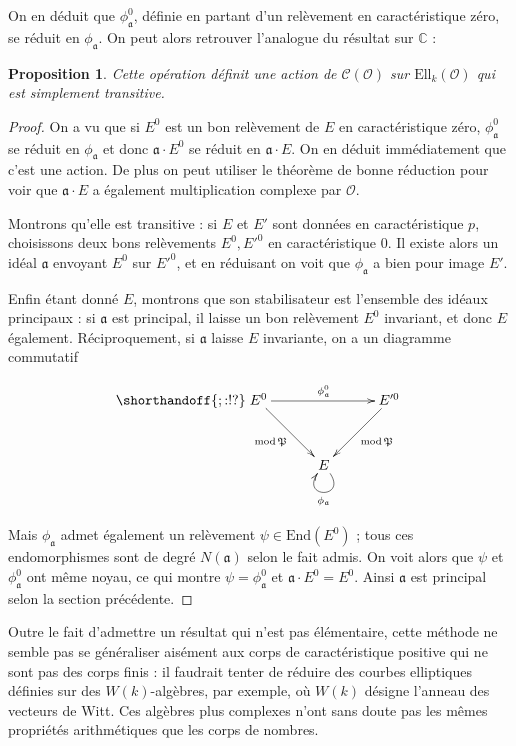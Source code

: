 \documentclass[11pt,a4paper]{article}
\newcommand{\C}{\mathbb{C}}
\renewcommand{\O}{\mathcal{O}}
\newcommand{\Cl}{\mathcal{C}}
\newcommand{\End}{\mathrm{End}}
\newcommand{\Ell}{\mathrm{Ell}}
\renewcommand{\frak}{\mathfrak}
\newtheorem*{prop}{Proposition}
\theoremstyle{definition}
\begin{document}
On en déduit que $\phi_{\frak a}^0$, définie en partant d'un relèvement en caractéristique zéro, se réduit en $\phi_{\frak a}$. On peut alors retrouver l'analogue du résultat sur $\C$ :

\begin{prop}

Cette opération définit une action de $\Cl(\O)$ sur $\Ell_k(\O)$ qui est simplement transitive.

\end{prop}

\begin{proof}

On a vu que si $E^0$ est un bon relèvement de $E$ en caractéristique zéro, $\phi_{\frak a}^0$ se réduit en $\phi_{\frak a}$ et donc $\frak a\cdot E^0$ se réduit en $\frak a\cdot E$. On en déduit immédiatement que c'est une action. De plus on peut utiliser le théorème de bonne réduction pour voir que $\frak a\cdot E$ a également multiplication complexe par $\O$.

Montrons qu'elle est transitive : si $E$ et $E'$ sont données en caractéristique $p$, choisissons deux bons relèvements $E^0, E'^0$ en caractéristique 0. Il existe alors un idéal $\frak a$ envoyant $E^0$ sur $E'^0$, et en réduisant on voit que $\phi_{\frak a}$ a bien pour image $E'$.

Enfin étant donné $E$, montrons que son stabilisateur est l'ensemble des idéaux principaux : si $\frak a$ est principal, il laisse un bon relèvement $E^0$ invariant, et donc $E$ également. Réciproquement, si $\frak a$ laisse $E$ invariante, on a un diagramme commutatif

$$
\shorthandoff{;:!?}
\xymatrix @!=8mm {
E^0 \ar[rr]^{\phi_{\frak a}^0} \ar[rd]_{\mathrm{mod}\,\frak P} & & E'^0 \ar[ld]^{\mathrm{mod}\,\frak P} \\
 & E \ar@(dr,dl)^{\phi_{\frak a}} & 
}
$$

Mais $\phi_{\frak a}$ admet également un relèvement $\psi\in \End(E^0)$ ; tous ces endomorphismes sont de degré $N(\frak a)$ selon le fait admis. On voit alors que $\psi$ et $\phi_{\frak a}^0$ ont même noyau, ce qui montre $\psi=\phi_{\frak a}^0$ et $\frak a\cdot E^0 = E^0$. Ainsi $\frak a$ est principal selon la section précédente.
\end{proof}


Outre le fait d'admettre un résultat qui n'est pas élémentaire, cette méthode ne semble pas se généraliser aisément aux corps de caractéristique positive qui ne sont pas des corps finis : il faudrait tenter de réduire des courbes elliptiques définies sur des $W(k)$-algèbres, par exemple, où $W(k)$ désigne l'anneau des vecteurs de Witt. Ces algèbres plus complexes n'ont sans doute pas les mêmes propriétés arithmétiques que les corps de nombres.
\end{document}

